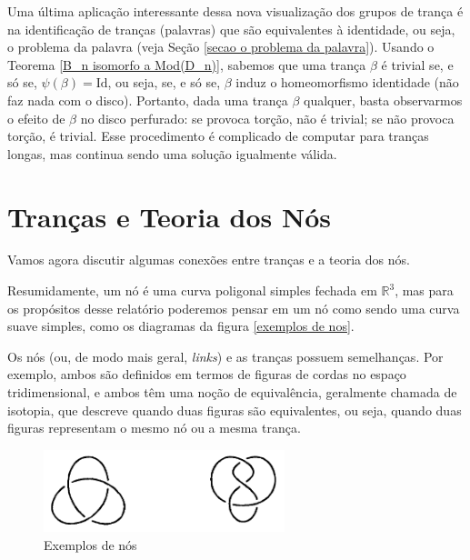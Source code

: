 \documentclass[a4paper,portuguese,11pt,twoside, leqno]{book}
\theoremstyle{definition}
\begin{document}
	\par\vspace{0.3cm} Uma última aplicação interessante dessa nova visualização dos grupos de trança é na identificação de tranças (palavras) que são equivalentes à identidade, ou seja, o problema da palavra (veja Seção \ref{secao o problema da palavra}). Usando o Teorema \eqref{B_n isomorfo a Mod(D_n)}, sabemos que uma trança $\beta$ é trivial se, e só se, $\psi(\beta) = \text{Id}$, ou seja, se, e só se, $\beta$ induz o homeomorfismo identidade (não faz nada com o disco). Portanto, dada uma trança $\beta$ qualquer, basta observarmos o efeito de $\beta$ no disco perfurado: se provoca torção, não é trivial; se não provoca torção, é trivial. Esse procedimento é complicado de computar para tranças longas, mas continua sendo uma solução igualmente válida.
	
	\chapter{Tranças e Teoria dos Nós}\label{secao trancas e teoria dos nos}
	\hspace{12pt} Vamos agora discutir algumas conexões entre tranças e a teoria dos nós.
	\par\vspace{0.3cm} Resumidamente, um nó é uma curva poligonal simples fechada em $\mathbb{R}^3$, mas para os propósitos desse relatório poderemos pensar em um nó como sendo uma curva suave simples, como os diagramas da figura \eqref{exemplos de nos}.
	
	\par\vspace{0.3cm} Os nós (ou, de modo mais geral, \textit{links}) e as tranças possuem semelhanças. Por exemplo, ambos são definidos em termos de figuras de cordas no espaço tridimensional, e ambos têm uma noção de equivalência, geralmente chamada de isotopia, que descreve quando duas figuras são equivalentes, ou seja, quando duas figuras representam o mesmo nó ou a mesma trança.  
	
	\begin{figure}[H]
		\begin{center}
			\includegraphics[width=7cm]{exemplos_de_no.png}
		\end{center}\caption{Exemplos de nós}
		\label{exemplos de nos}
	\end{figure}
	
\end{document}
